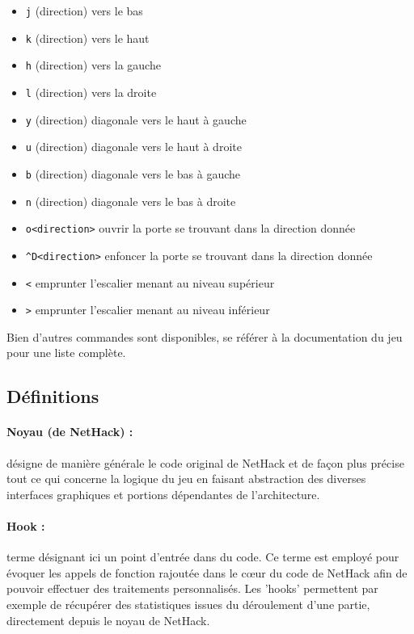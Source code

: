 \documentclass[a4paper,12pt]{article}
\begin{document}
\begin{itemize}
	\item \verb!j! (direction) vers le bas
	\item \verb!k! (direction) vers le haut
	\item \verb!h! (direction) vers la gauche
	\item \verb!l! (direction) vers la droite
	\item \verb!y! (direction) diagonale vers le haut à gauche
	\item \verb!u! (direction) diagonale vers le haut à droite
	\item \verb!b! (direction) diagonale vers le bas à gauche
	\item \verb!n! (direction) diagonale vers le bas à droite
	\item \verb!o<direction>! ouvrir la porte se trouvant dans la direction donnée
	\item \verb!^D<direction>! enfoncer la porte se trouvant dans la direction donnée
	\item \verb!<! emprunter l'escalier menant au niveau supérieur
	\item \verb!>! emprunter l'escalier menant au niveau inférieur
\end{itemize}

Bien d'autres commandes sont disponibles, se référer à la documentation du
jeu pour une liste complète.

\subsection*{Définitions}

\paragraph{Noyau (de NetHack) :}désigne de manière générale le code original de
NetHack et de façon plus précise tout ce qui concerne la logique du jeu en
faisant abstraction des diverses interfaces graphiques et portions dépendantes
de l'architecture.

\paragraph{Hook :}terme désignant ici un point d'entrée dans du code. Ce terme est
employé pour évoquer les appels de fonction rajoutée dans le cœur du code
de NetHack afin de pouvoir effectuer des traitements personnalisés. Les
'hooks' permettent par exemple de récupérer des statistiques issues du
déroulement d'une partie, directement depuis le noyau de NetHack.
\end{document}
